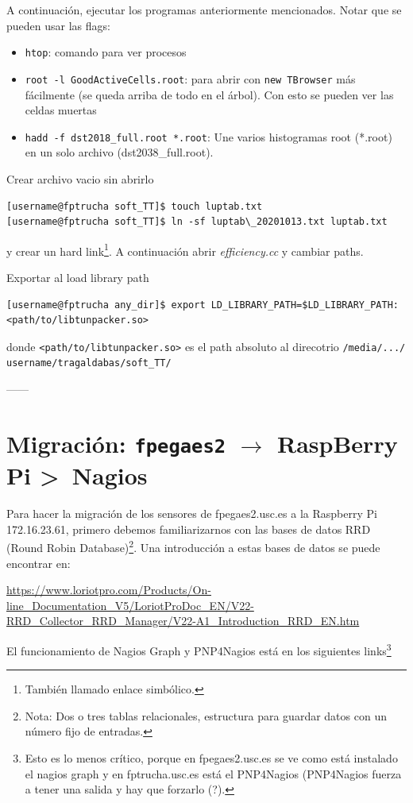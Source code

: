 \documentclass[a4paper]{book}
\begin{document}
A continuación, ejecutar los programas anteriormente mencionados. Notar que se pueden usar las flags:
\begin{itemize}
	\item \texttt{htop}: comando para ver procesos
	\item \texttt{root -l GoodActiveCells.root}: para abrir con \texttt{new TBrowser} más fácilmente (se queda arriba de todo en el árbol). Con esto se pueden ver las celdas muertas
	\item \texttt{hadd -f dst2018\_full.root *.root}: Une varios histogramas root (*.root) en un solo archivo (dst2038\_full.root).
\end{itemize}


Crear archivo vacio sin abrirlo
\begin{lstlisting}[style=customsh]
[username@fptrucha soft_TT]$ touch luptab.txt
[username@fptrucha soft_TT]$ ln -sf luptab\_20201013.txt luptab.txt
\end{lstlisting}
y crear un hard link\footnote{También llamado enlace simbólico.}. A continuación abrir \textit{efficiency.cc} y cambiar paths.

Exportar al load library path
\begin{lstlisting}[style=customsh]
[username@fptrucha any_dir]$ export LD_LIBRARY_PATH=$LD_LIBRARY_PATH:<path/to/libtunpacker.so>
\end{lstlisting}
donde \texttt{<path/to/libtunpacker.so>} es el path absoluto al direcotrio \texttt{/media/.../ username/tragaldabas/soft\_TT/}


------


\chapter{Migración: \texttt{fpegaes2} $\rightarrow$ RaspBerry Pi \textgreater\ Nagios}

Para hacer la migración de los sensores de fpegaes2.usc.es a la Raspberry Pi 172.16.23.61, primero debemos familiarizarnos con las bases de datos RRD (Round Robin Database)\footnote{Nota: Dos o tres tablas relacionales, estructura para guardar datos con un número fijo de entradas.}. Una introducción a estas bases de datos se puede encontrar en:

\url{https://www.loriotpro.com/Products/On-line_Documentation_V5/LoriotProDoc_EN/V22-RRD_Collector_RRD_Manager/V22-A1_Introduction_RRD_EN.htm}

El funcionamiento de Nagios Graph y PNP4Nagios está en los siguientes links\footnote{Esto es lo menos crítico, porque en fpegaes2.usc.es se ve como está instalado el nagios graph y en fptrucha.usc.es está el PNP4Nagios (PNP4Nagios fuerza a tener una salida y hay que forzarlo (?).}
\end{document}
